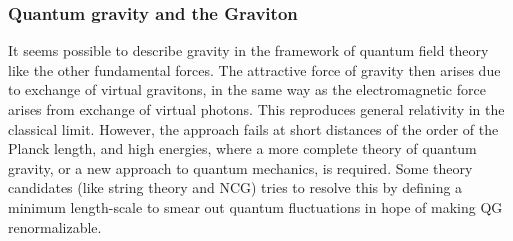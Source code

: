 \subsubsection{Quantum gravity and the Graviton}
It seems possible to describe gravity in the framework of quantum field theory like the other fundamental forces. The attractive force of gravity then arises due to exchange of virtual gravitons, in the same way as the electromagnetic force arises from exchange of virtual photons. This reproduces general relativity in the classical limit. However, the approach fails at short distances of the order of the Planck length, and high energies, where a more complete theory of quantum gravity, or a new approach to quantum mechanics, is required. Some theory candidates (like string theory and NCG) tries to resolve this by defining a minimum length-scale to smear out quantum fluctuations in hope of making QG renormalizable.
